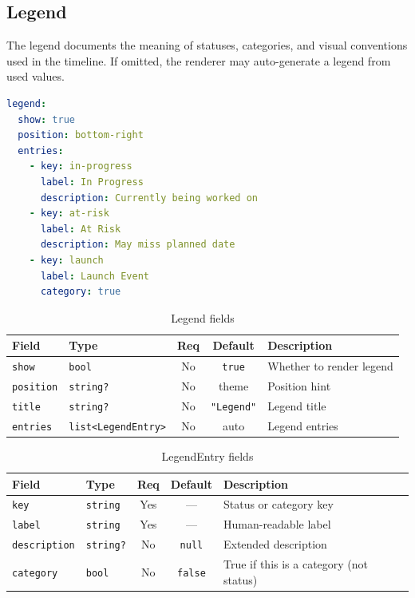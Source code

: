 \subsection{Legend}
\label{sec:ir-legend}

The legend documents the meaning of statuses, categories, and visual conventions used
in the timeline. If omitted, the renderer may auto-generate a legend from used values.

\begin{lstlisting}[language=yaml,caption={Legend example}]
legend:
  show: true
  position: bottom-right
  entries:
    - key: in-progress
      label: In Progress
      description: Currently being worked on
    - key: at-risk
      label: At Risk
      description: May miss planned date
    - key: launch
      label: Launch Event
      category: true
\end{lstlisting}

\begin{table}[h]
\centering
\small
\begin{tabular}{llccp{5cm}}
\toprule
\textbf{Field} & \textbf{Type} & \textbf{Req} & \textbf{Default} & \textbf{Description} \\
\midrule
\texttt{show} & \texttt{bool} & No & \texttt{true} & Whether to render legend \\
\texttt{position} & \texttt{string?} & No & theme & Position hint \\
\texttt{title} & \texttt{string?} & No & \texttt{"Legend"} & Legend title \\
\texttt{entries} & \texttt{list<LegendEntry>} & No & auto & Legend entries \\
\bottomrule
\end{tabular}
\caption{Legend fields}
\label{tab:legend-fields}
\end{table}

\begin{table}[h]
\centering
\small
\begin{tabular}{llccp{5cm}}
\toprule
\textbf{Field} & \textbf{Type} & \textbf{Req} & \textbf{Default} & \textbf{Description} \\
\midrule
\texttt{key} & \texttt{string} & Yes & --- & Status or category key \\
\texttt{label} & \texttt{string} & Yes & --- & Human-readable label \\
\texttt{description} & \texttt{string?} & No & \texttt{null} & Extended description \\
\texttt{category} & \texttt{bool} & No & \texttt{false} & True if this is a category (not status) \\
\bottomrule
\end{tabular}
\caption{LegendEntry fields}
\label{tab:legend-entry-fields}
\end{table}



